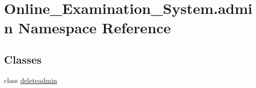 \hypertarget{namespace_online___examination___system_1_1admin}{}\section{Online\+\_\+\+Examination\+\_\+\+System.\+admin Namespace Reference}
\label{namespace_online___examination___system_1_1admin}
\subsection*{Classes}
\begin{DoxyCompactItemize}
\item 
class \mbox{\hyperlink{class_online___examination___system_1_1admin_1_1deleteadmin}{deleteadmin}}
\end{DoxyCompactItemize}
